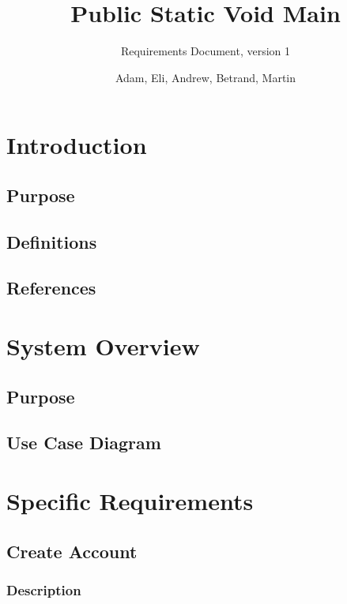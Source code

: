 \documentclass[12pt]{scrartcl}
\begin{document}
\title{Public Static Void Main}
\subtitle{Requirements Document, version 1}
\author{Adam, Eli, Andrew, Betrand, Martin}

\maketitle

\newpage\null\thispagestyle{empty}\newpage

\tableofcontents

\newpage\null\thispagestyle{empty}\newpage

\section{Introduction}

 

\subsection{Purpose}
\subsection{Definitions}
\subsection{References}

\section{System Overview}
\subsection{Purpose}
\subsection{Use Case Diagram}

\section{Specific Requirements}
\subsection{Create Account}
\subsubsection{Description}
\end{document}
